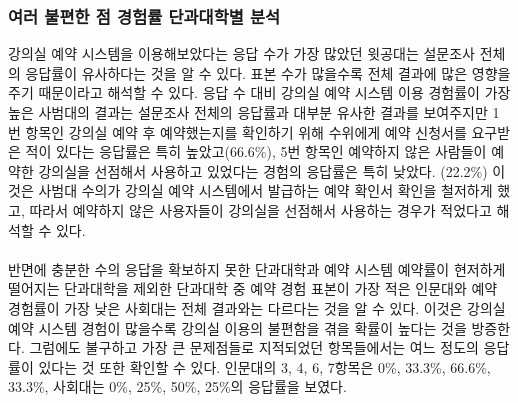 \documentclass[11pt,a4paper]{article}
\begin{document}
\subsubsection{여러 불편한 점 경험률 단과대학별 분석}
강의실 예약 시스템을 이용해보았다는 응답 수가 가장 많았던 윗공대는 설문조사 전체의 응답률이 유사하다는 것을 알 수 있다. 표본 수가 많을수록 전체 결과에 많은 영향을 주기 때문이라고 해석할 수 있다. 응답 수 대비 강의실 예약 시스템 이용 경험률이 가장 높은 사범대의 결과는 설문조사 전체의 응답률과 대부분 유사한 결과를 보여주지만 1번 항목인 강의실 예약 후 예약했는지를 확인하기 위해 수위에게 예약 신청서를 요구받은 적이 있다는 응답률은 특히 높았고(66.6\%), 5번 항목인 예약하지 않은 사람들이 예약한 강의실을 선점해서 사용하고 있었다는 경험의 응답률은 특히 낮았다. (22.2\%) 이것은 사범대 수의가 강의실 예약 시스템에서 발급하는 예약 확인서 확인을 철저하게 했고, 따라서 예약하지 않은 사용자들이 강의실을 선점해서 사용하는 경우가 적었다고 해석할 수 있다.
\\
\\
반면에 충분한 수의 응답을 확보하지 못한 단과대학과 예약 시스템 예약률이 현저하게 떨어지는 단과대학을 제외한 단과대학 중 예약 경험 표본이 가장 적은 인문대와 예약 경험률이 가장 낮은 사회대는 전체 결과와는 다르다는 것을 알 수 있다. 이것은 강의실 예약 시스템 경험이 많을수록 강의실 이용의 불편함을 겪을 확률이 높다는 것을 방증한다. 그럼에도 불구하고 가장 큰 문제점들로 지적되었던 항목들에서는 여느 정도의 응답률이 있다는 것 또한 확인할 수 있다. 인문대의 3, 4, 6, 7항목은 0\%, 33.3\%, 66.6\%, 33.3\%, 사회대는 0\%, 25\%, 50\%, 25\%의 응답률을 보였다.
\end{document}
